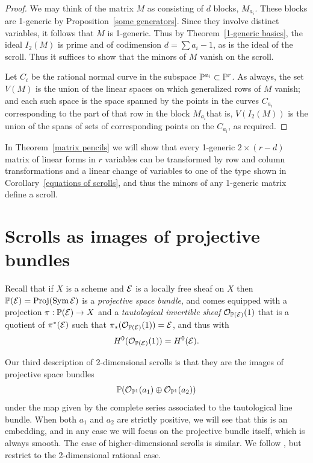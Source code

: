 \begin{proof} We may think of the matrix $M$ as consisting of $d$
blocks, $M_{a_{i}}$. These blocks are 1-generic by Proposition~\ref{some
generators}. Since they involve distinct variables, it follows that $M$
is 1-generic. Thus by
Theorem~\ref{1-generic basics}, the ideal $I_{2}(M)$ is prime and of
codimension $d = \sum a_{i}-1$, as is the ideal of the scroll. Thus it
suffices to show that the minors of $M$ vanish on the scroll.

Let $C_{i}$ be the rational normal curve in the subspace
${\mathbb P}^{a_{i}}\subset{\mathbb P}^{r}$.
As always, the set $V(M)$ is the union of the linear spaces on which
generalized rows of $M$ vanish; and each such space is the space spanned
by the points in the curves $C_{a_{i}}$ corresponding to the part of that
row in the block $M_{a_{i}}$\emdash that is, $V(I_{2}(M))$ is the union of
the spans of sets of corresponding points on the $C_{a_{i}}$, as required.
\end{proof}

In Theorem~\ref{matrix pencils} we will show that every
1-generic $2 \times (r-d)$ matrix of linear forms in $r$ variables can
be transformed by row and column transformations and a linear change
of variables to one of the type shown in
Corollary~\ref{equations of scrolls}, and thus the minors of any 1-generic
matrix define a scroll.

\section{Scrolls as images of projective bundles}\label{inscrutable name}

Recall that if $X$ is a scheme and ${\mathcal E}$ is a locally free sheaf on
$X$ then ${\mathbb P}({\mathcal E}) = \operatorname{Proj}(\operatorname{Sym} {\mathcal E})$ is a 
\emph{projective space bundle}, 
%
and comes equipped with a projection $\pi: {\mathbb P}({\mathcal E}) \to X$
and a \emph{tautological invertible sheaf} ${\mathcal O}_{{\mathbb P}({\mathcal E})}(1)$ that is
%
a quotient of $\pi^{*}({\mathcal E})$ such that $\pi_{*}({\mathcal O}_{{\mathbb P}({\mathcal E})}(1)) =
{\mathcal E}$, and thus with
$$
H^{0}({\mathcal O}_{{\mathbb P}({\mathcal E})}(1)) = H^{0}({\mathcal E}).
$$

Our third description of 2-dimensional scrolls is that they are the
images of projective space bundles
$$
{\mathbb P}({\mathcal O}_{{\mathbb P}^{1}}(a_{1})\oplus {\mathcal O}_{{\mathbb P}^{1}}(a_{2}))
$$
under the map given by the complete series associated to the 
tautological line bundle.
%
When both $a_{1}$ and $a_{2}$ are strictly positive,
we will see that this is an embedding, and in any case we will focus
on the projective bundle itself, which is always smooth. The case
of higher-dimensional scrolls is similar. We follow  
\cite[Chapter V]{Hartshorne1977}, but restrict
to the 2-dimensional rational case.

